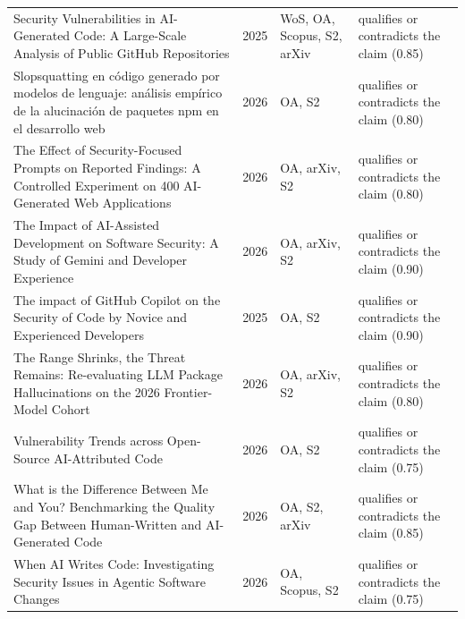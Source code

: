 \begin{longtable}{@{}%
  >{\raggedright\arraybackslash}p{}c%
  >{\raggedright\arraybackslash}p{}%
  >{\raggedright\arraybackslash}p{}@{}}
Security Vulnerabilities in AI-Generated Code: A Large-Scale Analysis of Public GitHub Repositories & 2025 & WoS, OA, Scopus, S2, arXiv & qualifies or contradicts the claim (0.85) \\
Slopsquatting en código generado por modelos de lenguaje: análisis empírico de la alucinación de paquetes npm en el desarrollo web & 2026 & OA, S2 & qualifies or contradicts the claim (0.80) \\
The Effect of Security-Focused Prompts on Reported Findings: A Controlled Experiment on 400 AI-Generated Web Applications & 2026 & OA, arXiv, S2 & qualifies or contradicts the claim (0.80) \\
The Impact of AI-Assisted Development on Software Security: A Study of Gemini and Developer Experience & 2026 & OA, arXiv, S2 & qualifies or contradicts the claim (0.90) \\
The impact of GitHub Copilot on the Security of Code by Novice and Experienced Developers & 2025 & OA, S2 & qualifies or contradicts the claim (0.90) \\
The Range Shrinks, the Threat Remains: Re-evaluating LLM Package Hallucinations on the 2026 Frontier-Model Cohort & 2026 & OA, arXiv, S2 & qualifies or contradicts the claim (0.80) \\
Vulnerability Trends across Open-Source AI-Attributed Code & 2026 & OA, S2 & qualifies or contradicts the claim (0.75) \\
What is the Difference Between Me and You? Benchmarking the Quality Gap Between Human-Written and AI-Generated Code & 2026 & OA, S2, arXiv & qualifies or contradicts the claim (0.85) \\
When AI Writes Code: Investigating Security Issues in Agentic Software Changes & 2026 & OA, Scopus, S2 & qualifies or contradicts the claim (0.75) \\
\end{longtable}
\endgroup
